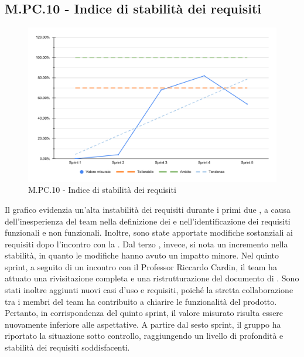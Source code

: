 \subsection{M.PC.10 - Indice di stabilità dei requisiti}
\begin{figure}[H]
    \centering
    \includegraphics[width=\textwidth]{assets/stabilita_requisiti.pdf}
    \caption{M.PC.10 - Indice di stabilità dei requisiti}
\end{figure}

\par Il grafico evidenzia un’alta instabilità dei requisiti durante i primi due , a causa dell’inesperienza del team nella definizione dei  e nell’identificazione dei requisiti funzionali e non funzionali. Inoltre, sono state apportate modifiche sostanziali ai requisiti dopo l’incontro con la . Dal terzo , invece, si nota un incremento nella stabilità, in quanto le modifiche hanno avuto un impatto minore. Nel quinto sprint, a seguito di un incontro con il Professor Riccardo Cardin, il team ha attuato una rivisitazione completa e una ristrutturazione del documento di \AdR. Sono stati inoltre aggiunti nuovi casi d’uso e requisiti, poiché la stretta collaborazione tra i membri del team ha contribuito a chiarire le funzionalità del prodotto. Pertanto, in corrispondenza del quinto sprint, il valore misurato risulta essere nuovamente inferiore alle aspettative. A partire dal sesto sprint, il gruppo ha riportato la situazione sotto controllo, raggiungendo un livello di profondità e stabilità dei requisiti soddisfacenti.
